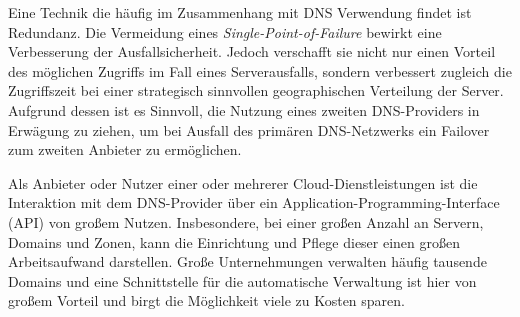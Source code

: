 Eine Technik die häufig im Zusammenhang mit DNS Verwendung findet ist Redundanz. Die Vermeidung eines \textit{Single-Point-of-Failure} bewirkt eine Verbesserung der Ausfallsicherheit. Jedoch verschafft sie nicht nur einen Vorteil des möglichen Zugriffs im Fall eines Serverausfalls, sondern verbessert zugleich die Zugriffszeit bei einer strategisch sinnvollen geographischen Verteilung der Server. Aufgrund dessen ist es Sinnvoll, die Nutzung eines zweiten DNS-Providers in Erwägung zu ziehen, um bei Ausfall des primären DNS-Netzwerks ein Failover zum zweiten Anbieter zu ermöglichen.\cite{Stratusly.2017}

Als Anbieter oder Nutzer einer oder mehrerer Cloud-Dienstleistungen ist die Interaktion mit dem DNS-Provider über ein Application-Programming-Interface (API) von großem Nutzen. Insbesondere, bei einer großen Anzahl an Servern, Domains und Zonen, kann die Einrichtung und Pflege dieser einen großen Arbeitsaufwand darstellen. Große Unternehmungen verwalten häufig tausende Domains und eine Schnittstelle für die automatische Verwaltung ist hier von großem Vorteil und birgt die Möglichkeit viele zu Kosten sparen.
